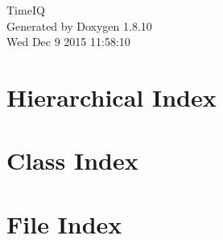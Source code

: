 \documentclass[twoside]{book}
\newcommand{\+}{\discretionary{\mbox{\scriptsize$\hookleftarrow$}}{}{}}
\newcommand{\clearemptydoublepage}{%
  \newpage{\pagestyle{empty}\cleardoublepage}%
}
\begin{document}
\hypersetup{pageanchor=false,
             bookmarks=true,
             bookmarksnumbered=true,
             pdfencoding=unicode
            }
\begin{titlepage}
\vspace*{7cm}
\begin{center}%
{\Large Time\+I\+Q }\\
\vspace*{1cm}
{\large Generated by Doxygen 1.8.10}\\
\vspace*{0.5cm}
{\small Wed Dec 9 2015 11:58:10}\\
\end{center}
\end{titlepage}
\clearemptydoublepage
\tableofcontents
\clearemptydoublepage
{}
\hypersetup{pageanchor=true}

\chapter{Hierarchical Index}

\chapter{Class Index}

\chapter{File Index}

\end{document}

